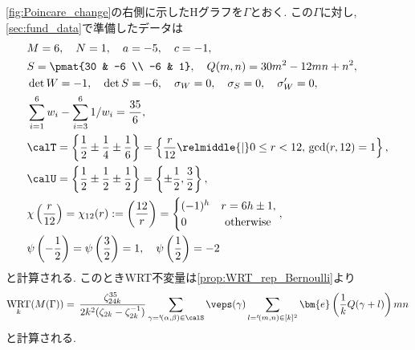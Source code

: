 \documentclass[11pt,b5paper,oneside,lualatex]{ltjsarticle} %
\DeclareMathOperator{\WRT}{WRT}
\numberwithin{equation}{section} %
\begin{document}
\cref{fig:Poincare_change}の右側に示したHグラフを$ \Gamma $とおく. 
この$ \Gamma $に対し, \cref{sec:fund_data}で準備したデータは
\begin{align}
	&M = 6, \quad
	N = 1, \quad
	a = -5, \quad
	c = -1, 
	\\
	&S = \pmat{30 & -6 \\ -6 & 1}, \quad
	Q(m, n) = 30m^2 - 12mn + n^2,
	\\
	&\det W = -1, \quad
	\det S = -6, \quad
	\sigma_W = 0, \quad
	\sigma_S = 0, \quad
	\sigma'_W = 0, \quad
	\\
	&\sum_{i=1}^{6}w_{i} - \sum_{i=3}^{6} 1/w_{i}
	= \frac{35}{6},
	\\
	&\calT = \left\{ \frac{1}{2} \pm \frac{1}{4} \pm \frac{1}{6} \right\} 
	= \left\{ \frac{r}{12} \relmiddle{|} 0 \le r < 12, \, \gcd(r, 12) = 1 \right\},
	\\
	&\calU = \left\{ \frac{1}{2} \pm \frac{1}{2} \pm \frac{1}{2} \right\} 
	= \left\{ \pm \frac{1}{2}, \frac{3}{2}  \right\},
	\\
	&\chi \left( \frac{r}{12} \right)
	= \chi_{12} (r)
	:=
	\left( \frac{12}{r} \right) =
	\begin{cases}
		(-1)^h & r = 6h \pm 1, \\
		0 & \text{ otherwise}
	\end{cases},
	\\
	&\psi \left( -\frac{1}{2} \right)
	= \psi \left( \frac{3}{2} \right)
	= 1, \quad
	\psi \left( \frac{1}{2} \right)
	= -2
\end{align}
と計算される. 
このときWRT不変量は\cref{prop:WRT_rep_Bernoulli}より
\begin{align}
	\WRT_k(M(\Gamma)) 
	= \,
	\frac{\zeta_{24k}^{35}}{2k^2 (\zeta_{2k}-\zeta_{2k}^{-1})}
	\sum_{\gamma = {}^t\!(\alpha, \beta) \in \calS} 
	\veps(\gamma)
	\sum_{l = {}^t\!(m, n) \in [k]^2}
	\bm{e}\left( \frac{1}{k} Q(\gamma + l) \right) mn
\end{align}
と計算される. 
\end{document}

